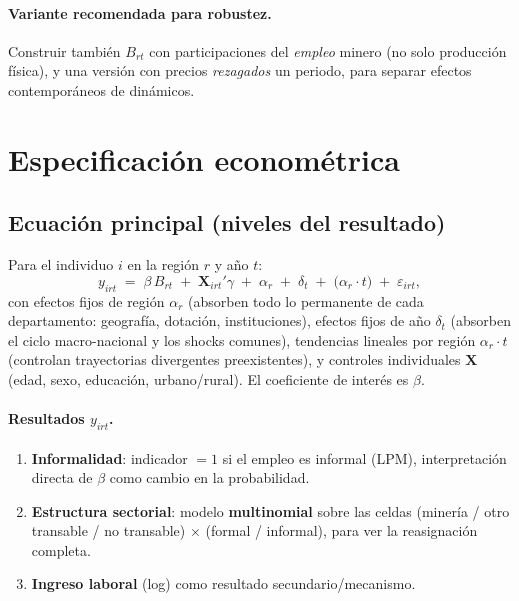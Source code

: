 \documentclass[11pt]{article}
\begin{document}
\paragraph{Variante recomendada para robustez.} Construir también $B_{rt}$ con participaciones
del \emph{empleo} minero (no solo producción física), y una versión con precios
\emph{rezagados} un periodo, para separar efectos contemporáneos de dinámicos.

\section{Especificación econométrica}

\subsection{Ecuación principal (niveles del resultado)}
Para el individuo $i$ en la región $r$ y año $t$:
\begin{equation}
y_{irt} \;=\; \beta\, B_{rt} \;+\; \mathbf{X}_{irt}'\gamma \;+\; \alpha_r \;+\; \delta_t
\;+\; \big(\alpha_r \cdot t\big) \;+\; \varepsilon_{irt},
\label{eq:main}
\end{equation}
con efectos fijos de región $\alpha_r$ (absorben todo lo permanente de cada departamento:
geografía, dotación, instituciones), efectos fijos de año $\delta_t$ (absorben el ciclo
macro-nacional y los shocks comunes), tendencias lineales por región $\alpha_r\cdot t$
(controlan trayectorias divergentes preexistentes), y controles individuales $\mathbf{X}$
(edad, sexo, educación, urbano/rural). El coeficiente de interés es $\beta$.

\paragraph{Resultados $y_{irt}$.}
\begin{enumerate}[label=(\alph*), leftmargin=1.6em, itemsep=1pt]
  \item \textbf{Informalidad}: indicador $=1$ si el empleo es informal (LPM), interpretación
  directa de $\beta$ como cambio en la probabilidad.
  \item \textbf{Estructura sectorial}: modelo \textbf{multinomial} sobre las celdas
  (minería / otro transable / no transable) $\times$ (formal / informal), para ver la
  reasignación completa.
  \item \textbf{Ingreso laboral} (log) como resultado secundario/mecanismo.
\end{enumerate}
\end{document}
